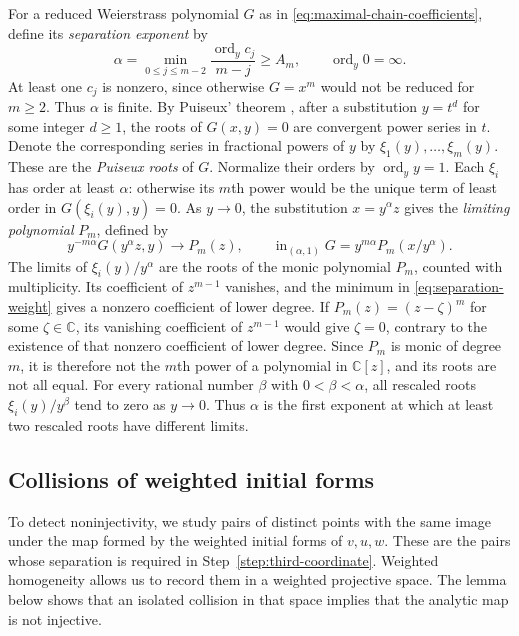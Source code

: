 \documentclass[11pt,letterpaper]{article}
\numberwithin{equation}{section}
\theoremstyle{remark}
\theoremstyle{plain}
\newcommand{\C}{\mathbb{C}}
\newcommand{\ord}{\operatorname{ord}}
\begin{document}
For a reduced Weierstrass polynomial $G$ as in
\eqref{eq:maximal-chain-coefficients}, define its \emph{separation exponent} by
\begin{equation}
 \alpha=\min_{0\leq j\leq m-2}\frac{\ord_yc_j}{m-j}\geq A_m,
 \qquad \ord_y0=\infty.
 \label{eq:separation-weight}
\end{equation}
At least one $c_j$ is nonzero, since otherwise $G=x^m$ would not
be reduced for $m\geq2$.  Thus $\alpha$ is finite.  By Puiseux' theorem
\cite[Theorem~2.2.6]{Wall}, after a substitution $y=t^d$ for some
integer $d\geq1$, the roots of $G(x,y)=0$ are
convergent power series in $t$.  Denote the corresponding series in
fractional powers of $y$ by $\xi_1(y),\ldots,\xi_m(y)$.
These are the \emph{Puiseux roots} of $G$.  Normalize their orders by
$\ord_y y=1$.  Each $\xi_i$ has order at least $\alpha$:
otherwise its $m$th power would be the unique term of least order
in $G(\xi_i(y),y)=0$.  As $y\to0$, the substitution $x=y^\alpha z$ gives the
\emph{limiting polynomial} $P_m$, defined by
\begin{equation}
 y^{-m\alpha}G(y^\alpha z,y)\longrightarrow P_m(z),\qquad
 \operatorname{in}_{(\alpha,1)}G=y^{m\alpha}P_m(x/y^\alpha).
 \label{eq:limiting-polynomial}
\end{equation}
The limits of $\xi_i(y)/y^\alpha$ are the roots of the monic polynomial
$P_m$, counted with multiplicity.  Its coefficient of $z^{m-1}$
vanishes, and the minimum in \eqref{eq:separation-weight} gives a
nonzero coefficient of lower degree.  If $P_m(z)=(z-\zeta)^m$ for some
$\zeta\in\C$, its vanishing coefficient of $z^{m-1}$ would give
$\zeta=0$, contrary to the existence of that nonzero coefficient
of lower degree.
Since $P_m$ is monic of degree $m$, it is therefore not the $m$th
power of a polynomial in $\C[z]$, and its roots are not all equal.
For every rational number $\beta$ with $0<\beta<\alpha$, all
rescaled roots $\xi_i(y)/y^\beta$ tend to zero as $y\to0$.  Thus
$\alpha$ is the first exponent at which at least two rescaled roots
have different limits.

\subsection{Collisions of weighted initial forms}

To detect noninjectivity, we study pairs of distinct points with the
same image under the map formed by the weighted initial forms of
$v,u,w$.  These are the pairs whose
separation is required in Step~\ref{step:third-coordinate}.
Weighted homogeneity allows us to record them in a weighted
projective space.  The lemma below shows that an isolated collision
in that space implies that the analytic map is not injective.
\end{document}
